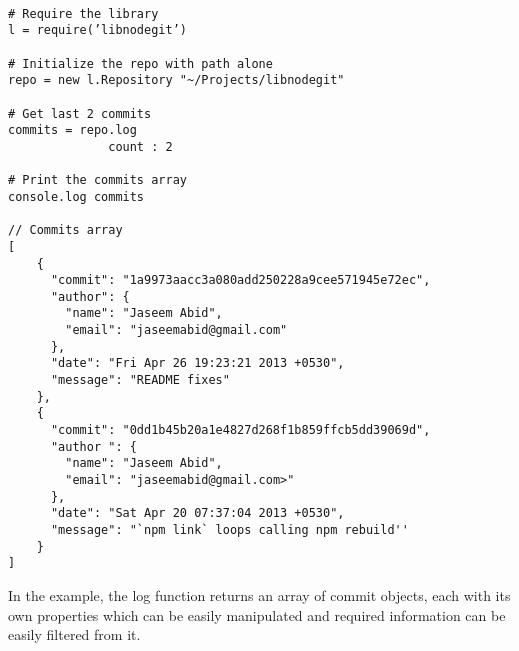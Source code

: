 \begin{verbatim}

# Require the library
l = require(’libnodegit’)

# Initialize the repo with path alone
repo = new l.Repository "~/Projects/libnodegit"

# Get last 2 commits
commits = repo.log
              count : 2

# Print the commits array
console.log commits

// Commits array
[
    {
      "commit": "1a9973aacc3a080add250228a9cee571945e72ec",
      "author": {
        "name": "Jaseem Abid",
        "email": "jaseemabid@gmail.com"
      },
      "date": "Fri Apr 26 19:23:21 2013 +0530",
      "message": "README fixes"
    },
    {
      "commit": "0dd1b45b20a1e4827d268f1b859ffcb5dd39069d",
      "author ": {
        "name": "Jaseem Abid",
        "email": "jaseemabid@gmail.com>"
      },
      "date": "Sat Apr 20 07:37:04 2013 +0530",
      "message": "`npm link` loops calling npm rebuild''
    }
]

\end{verbatim}

In the example, the log function returns an array of commit objects, each with
its own properties which can be easily manipulated and required information can
be easily filtered from it.
